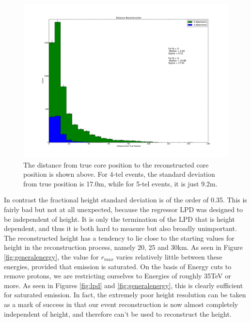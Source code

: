 \documentclass[11pt]{article}
\begin{document}
\begin{figure}
\begin{center}
\includegraphics[width=\textwidth]{rawposition}
\caption{The distance from true core position to the reconstructed core position is shown above. For 4-tel events, the standard deviation from true position is 17.0m, while for 5-tel events, it is just 9.2m.}
\label{fig:rawposition}
\end{center}
\end{figure}

In contrast the fractional height standard deviation is of the order of 0.35. This is fairly bad but not at all unexpected, because the regressor LPD was designed to be independent of height. It is only the termination of the LPD that is height dependent, and thus it is both hard to measure but also broadly unimportant. The reconstructed height has a tendency to lie close to the starting values for height in the reconstruction process, namely 20, 25 and 30km. As seen in Figure \ref{fig:generalenergy}, the value for $r_{max}$ varies relatively little between these energies, provided that emission is saturated. On the basis of Energy cuts to remove protons, we are restricting ourselves to Energies of roughly 35TeV or more. As seen in Figures \ref{fig:lpd} and \ref{fig:generalenergy}, this is clearly sufficient for saturated emission. In fact, the extremely poor height resolution can be taken as a mark of success in that our event reconstruction is now almost completely independent of height, and therefore can't be used to reconstruct the height.  
\end{document}
